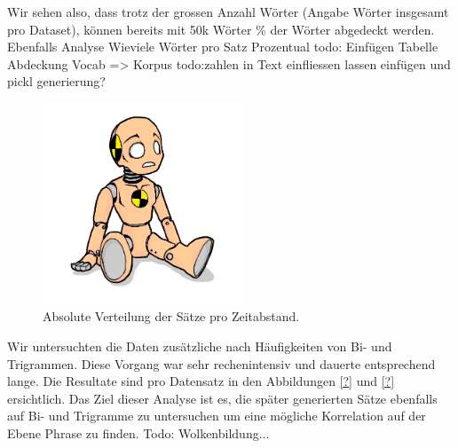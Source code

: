 Wir sehen also, dass trotz der grossen Anzahl Wörter (Angabe Wörter insgesamt pro Dataset), können bereits mit 50k Wörter \% der Wörter abgedeckt werden.
Ebenfalls Analyse Wieviele Wörter pro Satz Prozentual
todo: Einfügen Tabelle Abdeckung Vocab => Korpus
todo:zahlen in Text einfliessen lassen einfügen und pickl generierung?
\begin{figure}[h]
	\label{fig:data:analyse:timediff:opus}
	\centering
	\includegraphics[width=6cm]{img/dummy.png}
	\caption{Absolute Verteilung der Sätze pro Zeitabstand. \protect\footnotemark}
\end{figure}


Wir untersuchten die Daten zusätzliche nach Häufigkeiten von Bi- und Trigrammen. Diese Vorgang war sehr rechenintensiv und dauerte entsprechend lange. Die Resultate sind pro Datensatz in den Abbildungen \ref{?} und \ref{?} ersichtlich. Das Ziel dieser Analyse ist es, die später generierten Sätze ebenfalls auf Bi- und Trigramme zu untersuchen um eine mögliche Korrelation auf der Ebene Phrase zu finden.
Todo: Wolkenbildung...

